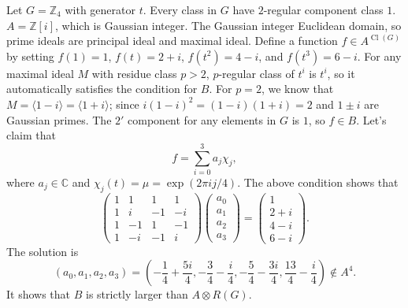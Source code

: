 \documentclass[a4paper, 12pt]{article}
\theoremstyle{Mydefinition}
\theoremstyle{Mytheorem}
\DeclareMathOperator{\cl}{Cl}
\begin{document}
Let $G=\mathbb{Z}_4$ with generator $t$. Every class in $G$ have $2$-regular component class $1$. $A = \mathbb{Z}[i]$, which is Gaussian integer. The Gaussian integer Euclidean domain, so prime ideals are principal ideal and maximal ideal. Define a function $f\in A^{\cl(G)}$ by setting $f(1)=1$, $f(t)=2+i$, $f(t^2)=4-i$, and $f(t^3)=6-i$. For any maximal ideal $M$ with residue class $p>2$, $p$-regular class of $t^i$ is $t^i$, so it automatically satisfies the condition for $B$. For $p=2$, we know that $M=\langle 1-i\rangle = \langle 1+i\rangle$; since $i(1-i)^2=(1-i)(1+i) = 2$ and $1\pm i$ are Gaussian primes. The $2'$ component for any elements in $G$ is $1$, so $f\in B$. Let's claim that
\begin{equation}
    f = \sum_{i=0}^3 a_j\chi_j,
\end{equation}
where $a_j\in \mathbb{C}$ and $\chi_j(t) = \mu = \exp(2\pi ij/4)$. The above condition shows that
\begin{equation}
    \begin{pmatrix}
    1 & 1 & 1 & 1\\
    1 & i & -1 & -i\\
    1 & -1 & 1 & -1\\
    1 & -i & -1 & i
    \end{pmatrix}
    \begin{pmatrix}
    a_0\\
    a_1\\
    a_2\\
    a_3
    \end{pmatrix} = \begin{pmatrix}
    1\\ 2+i\\4-i\\6-i
    \end{pmatrix}.
\end{equation}
    The solution is
    \begin{equation}
        (a_0,a_1,a_2,a_3) = \left(-\frac{1}{4}+\frac{5i}{4}, -\frac{3}{4}-\frac{i}{4}, -\frac{5}{4}-\frac{3i}{4}, \frac{13}{4}-\frac{i}{4}\right)\not\in A^{4}.
    \end{equation}
    It shows that $B$ is strictly larger than $A\otimes R(G)$.\\
\end{document}
